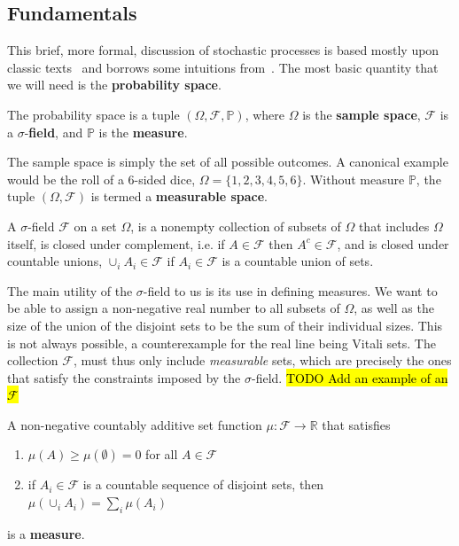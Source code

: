 \subsection{Fundamentals}
This brief, more formal, discussion of stochastic processes is based mostly upon classic texts~\cite{durrett2019probability, rogers1994diffusions, rogers2000diffusions} and borrows some intuitions from~\cite{sarkka2019applied}. The most basic quantity that we will need is the \textbf{probability space}. 
\begin{definition}
	The probability space is a tuple $(\Omega, \mathcal{F}, \mathbb{P})$, where $\Omega$ is the \textbf{sample space}, $\mathcal{F}$ is a $\sigma$-\textbf{field}, and $\mathbb{P}$ is the \textbf{measure}.
\end{definition}
The sample space is simply the set of all possible outcomes. A canonical example would be the roll of a 6-sided dice, $\Omega=\{1, 2, 3, 4, 5, 6\}$. Without measure $\mathbb{P}$, the tuple $(\Omega, \mathcal{F})$ is termed a \textbf{measurable space}.
\begin{definition}
	A $\sigma$-field $\mathcal{F}$ on a set $\Omega$, is a nonempty collection of subsets of $\Omega$ that includes $\Omega$ itself, is closed under complement, i.e. if $A \in \mathcal{F}$ then $A^c \in \mathcal{F}$, and is closed under countable unions, $\cup_{i} A_{i} \in \mathcal{F}$ if $A_{i} \in \mathcal{F}$ is a countable union of sets.
\end{definition}
The main utility of the $\sigma$-field to us is its use in defining measures. We want to be able to assign a non-negative real number to all subsets of $\Omega$, as well as the size of the union of the disjoint sets to be the sum of their individual sizes. This is not always possible, a counterexample for the real line being Vitali sets. The collection $\mathcal{F}$, must thus only include \emph{measurable} sets, which are precisely the ones that satisfy the constraints imposed by the $\sigma$-field. \hl{TODO Add an example of an $\mathcal{F}$}
\begin{definition}[Measure]
	A non-negative countably additive set function $\mu: \mathcal{F} \rightarrow \mathbb{R}$ that satisfies
	\begin{enumerate}[label=\roman*]
		\item $\mu(A) \geq \mu(\emptyset)=0$ for all $A \in \mathcal{F}$
		\item if $A_{i} \in \mathcal{F}$ is a countable sequence of disjoint sets, then $\mu\left(\cup_{i} A_{i}\right)=\sum_{i} \mu\left(A_{i}\right)$
	\end{enumerate}
	is a \textbf{measure}.
\end{definition}
